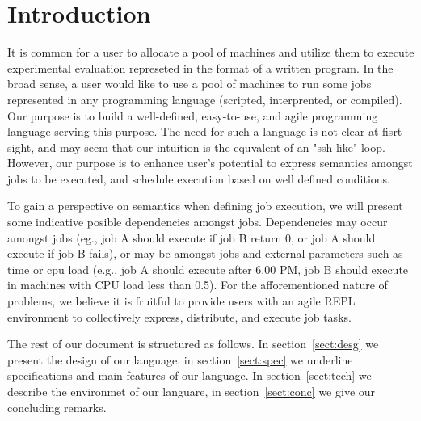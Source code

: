 \section{Introduction}
\label{sect:intro}
It is common for a user to allocate a pool of machines and utilize
them to execute experimental evaluation represeted in the format of
a written program. In the broad sense, a user would like to use a
pool of machines to run some jobs represented in any programming
language (scripted, interprented, or compiled). Our purpose is to
build a well-defined, easy-to-use, and agile programming language
serving this purpose. The need for such a language is not clear at
fisrt sight, and may seem that our intuition is the equvalent of an
"ssh-like" loop. However, our purpose is to enhance user's potential
to express semantics amongst jobs to be executed, and schedule
execution based on well defined conditions.

To gain a perspective
on semantics when  defining job  execution, we will present some
indicative posible dependencies amongst jobs. Dependencies may
occur amongst jobs (eg., job A should execute if job B return 0,
or job A  should execute if job B fails), or may be amongst jobs
and external parameters such as time or cpu load (e.g., job A should
execute after 6.00 PM, job B should execute in machines with CPU
load less than 0.5). For the afforementioned nature of problems, we
believe it is fruitful to provide users with an agile REPL
environment to collectively express, distribute, and execute job
tasks.

The rest of our document is structured as follows. In
section~\ref{sect:desg} we present the design of our language, in
section~\ref{sect:spec} we underline specifications and main
features of our language. In section~\ref{sect:tech} we describe
the environmet of our languare, in  section~\ref{sect:conc} we
give our concluding remarks.
